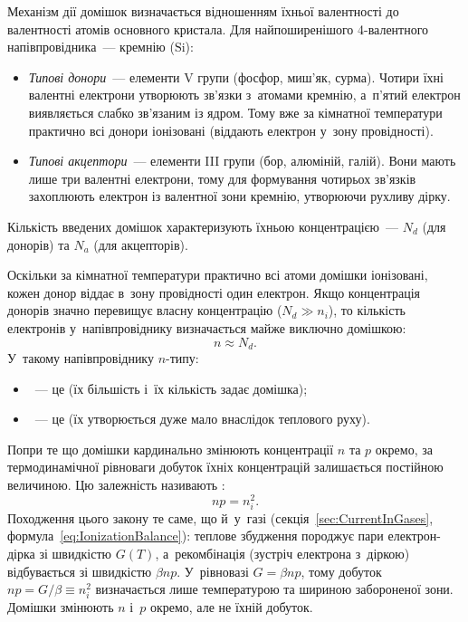 Механізм дії домішок визначається відношенням їхньої валентності до валентності атомів
основного кристала. Для найпоширенішого 4-валентного напівпровідника~--- кремнію
($\text{Si}$):
\begin{itemize}
	\item \emph{Типові донори}~--- елементи V групи (фосфор, миш'як, сурма). Чотири їхні
	  валентні електрони утворюють зв'язки з~атомами кремнію, а~п'ятий електрон
	  виявляється слабко зв'язаним із ядром. Тому вже за кімнатної температури практично
	  всі донори іонізовані (віддають електрон у~зону провідності).
	\item \emph{Типові акцептори}~--- елементи III групи (бор, алюміній, галій). Вони
	  мають лише три валентні електрони, тому для формування чотирьох зв'язків захоплюють
	  електрон із валентної зони кремнію, утворюючи рухливу дірку.
\end{itemize}

Кількість введених домішок характеризують їхньою концентрацією~--- $N_d$ (для донорів) та
$N_a$ (для акцепторів).

Оскільки за кімнатної температури практично всі атоми домішки іонізовані, кожен донор
віддає в~зону провідності один електрон. Якщо концентрація донорів значно перевищує власну
концентрацію ($N_d \gg n_i$), то кількість електронів у~напівпровіднику визначається майже
виключно домішкою:
\begin{equation}
	n \approx N_d.
\end{equation}
У~такому напівпровіднику $n$-типу:
\begin{itemize}
	\item {}~--- це  (їх більшість і~їх кількість
	  задає домішка);
	\item {}~--- це  (їх утворюється дуже мало внаслідок
	  теплового руху).
\end{itemize}

Попри те що домішки кардинально змінюють концентрації $n$ та $p$ окремо, за
термодинамічної рівноваги добуток їхніх концентрацій залишається постійною величиною. Цю
залежність називають :
\begin{equation}\label{eq:MassAction}
	np = n_i^2.
\end{equation}
Походження цього закону те саме, що й~у~газі (секція~\ref{sec:CurrentInGases},
формула~\eqref{eq:IonizationBalance}): теплове збудження породжує пари електрон-дірка зі
швидкістю $G(T)$, а~рекомбінація (зустріч електрона з~діркою) відбувається зі швидкістю
$\beta np$. У~рівновазі $G=\beta np$, тому добуток $np=G/\beta\equiv n_i^2$ визначається
лише температурою та шириною забороненої зони. Домішки змінюють $n$ і~$p$ окремо, але не
їхній добуток.

